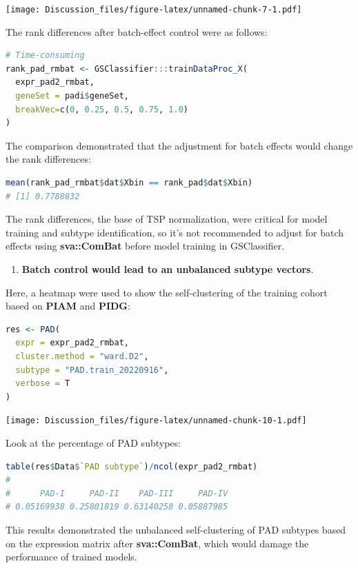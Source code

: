 \documentclass[
  12pt,
]{book}
\providecommand{\tightlist}{%
  \setlength{\itemsep}{0pt}\setlength{\parskip}{0pt}}
\begin{document}
\texttt{[image: Discussion\_files/figure-latex/unnamed-chunk-7-1.pdf]}

The rank differences after batch-effect control were as follows:

\begin{lstlisting}[language=R]
# Time-consuming
rank_pad_rmbat <- GSClassifier:::trainDataProc_X(
  expr_pad2_rmbat, 
  geneSet = padi$geneSet,
  breakVec=c(0, 0.25, 0.5, 0.75, 1.0)
)
\end{lstlisting}

The comparison demonstrated that the adjustment for batch effects would change the rank differences:

\begin{lstlisting}[language=R]
mean(rank_pad_rmbat$dat$Xbin == rank_pad$dat$Xbin)
# [1] 0.7788832
\end{lstlisting}

The rank differences, the base of TSP normalization, were critical for model training and subtype identification, so it's not recommended to adjust for batch effects using \textbf{sva::ComBat} before model training in GSClassifier.

\begin{enumerate}
\def\labelenumi{\arabic{enumi}.}
\setcounter{enumi}{1}
\tightlist
\item
  \textbf{Batch control would lead to an unbalanced subtype vectors}.
\end{enumerate}

Here, a heatmap were used to show the self-clustering of the training cohort based on \textbf{PIAM} and \textbf{PIDG}:

\begin{lstlisting}[language=R]
res <- PAD(
  expr = expr_pad2_rmbat,
  cluster.method = "ward.D2",
  subtype = "PAD.train_20220916",
  verbose = T
)
\end{lstlisting}

\texttt{[image: Discussion\_files/figure-latex/unnamed-chunk-10-1.pdf]}

Look at the percentage of PAD subtypes:

\begin{lstlisting}[language=R]
table(res$Data$`PAD subtype`)/ncol(expr_pad2_rmbat)
# 
#      PAD-I     PAD-II    PAD-III     PAD-IV 
# 0.05169938 0.25801819 0.63140258 0.05887985
\end{lstlisting}

This results demonstrated the unbalanced self-clustering of PAD subtypes based on the expression matrix after \textbf{sva::ComBat}, which would damage the performance of trained models.
\end{document}
